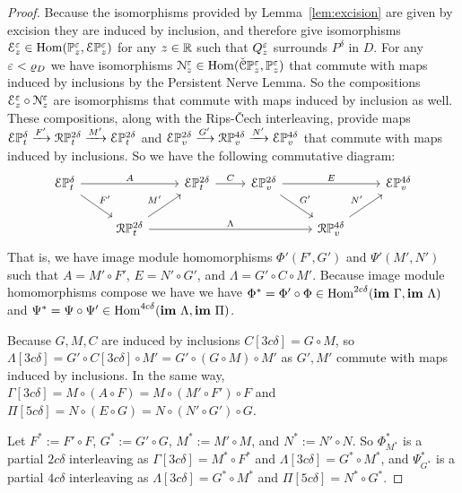 \begin{proof}
  Because the isomorphisms provided by Lemma~\ref{lem:excision} are given by excision they are induced by inclusion, and therefore give isomorphisms $\mathcal{E}_z^\varepsilon \in \mathrm{Hom}(\mathbb{P}_{z}^{\varepsilon},\mathcal{E} \mathbb{P}_{z}^{\varepsilon})$ for any $z\in\mathbb{R}$ such that $Q_z^\varepsilon$ surrounds $P^\delta$ in $D$.
  For any $\varepsilon < \varrho_D$ we have isomorphisms $\mathcal{N}_z^\varepsilon\in\mathrm{Hom}(\check{\mathcal{C}}\mathbb{P}_{z}^{\varepsilon}, \mathbb{P}_{z}^{\varepsilon})$ that commute with maps induced by inclusions by the Persistent Nerve Lemma.
  So the compositions $\mathcal{E}_z^\varepsilon\circ \mathcal{N}_z^\varepsilon$ are isomorphisms that commute with maps induced by inclusion as well.
  These compositions, along with the Rips-\v Cech interleaving, provide maps $\mathcal{E}\mathbb{P}_{t}^{\delta}\xrightarrow{F'}\mathcal{R}\mathbb{P}_{t}^{2\delta}\xrightarrow{M'} \mathcal{E}\mathbb{P}_{t}^{2\delta}$ and $\mathcal{E}\mathbb{P}_{v}^{2\delta}\xrightarrow{G'}\mathcal{R}\mathbb{P}_{v}^{4\delta}\xrightarrow{N'} \mathcal{E}\mathbb{P}_{v}^{4\delta}$ that commute with maps induced by inclusions.
  So we have the following commutative diagram:
  \begin{equation}
    \begin{tikzcd}
      \E\PP{t}{\delta}\arrow{rr}{A}\arrow{dr}{F'} & &
      \E\PP{t}{2\delta}\arrow{r}{C} &
      \E\PP{v}{2\delta}\arrow{rr}{E}\arrow{dr}{G'} & &
      \E\PP{v}{4\delta}\\
      & \RPP{t}{2\delta}\arrow{ur}{M'}\arrow[to=RV, "\Lambda"] & &
      & |[alias=RV]|\RPP{v}{4\delta}\arrow{ur}{N'} &
    \end{tikzcd}
  \end{equation}
  That is, we have image module homomorphisms $\Phi'(F', G')$ and $\Psi'(M', N')$ such that $A = M'\circ F'$, $E = N'\circ G'$, and $\Lambda = G'\circ C\circ M'$.
  Because image module homomorphisms compose we have we have $\Phi^* = \Phi'\circ \Phi\in\mathrm{Hom}^{2c\delta}(\mathbf{im}~\Gamma, \mathbf{im}~\Lambda)$ and $\Psi^* = \Psi\circ\Psi'\in\mathrm{Hom}^{4c\delta}(\mathbf{im}~\Lambda, \mathbf{im}~\Pi)$.

  Because $G,M,C$ are induced by inclusions $C[3c\delta] = G\circ M$, so $\Lambda[3c\delta] = G'\circ C[3c\delta]\circ M' = G'\circ (G\circ M)\circ M'$ as $G', M'$ commute with maps induced by inclusions.
  In the same way, $\Gamma[3c\delta] = M\circ (A\circ F) = M\circ (M'\circ F')\circ F$ and $\Pi[5c\delta] = N\circ (E\circ G) = N\circ (N'\circ G')\circ G$.

  Let $F^*:= F'\circ F$, $G^*:= G'\circ G$, $M^*:=M'\circ M$, and $N^*:=N'\circ N$.
  So $\Phi^*_{M^*}$ is a partial $2c\delta$ interleaving as $\Gamma[3c\delta] = M^*\circ F^*$ and $\Lambda[3c\delta] = G^*\circ M^*$, and $\Psi^*_{G^*}$ is a partial $4c\delta$ interleaving as $\Lambda[3c\delta] = G^*\circ M^*$ and $\Pi[5c\delta] = N^*\circ G^*$.
\end{proof}

